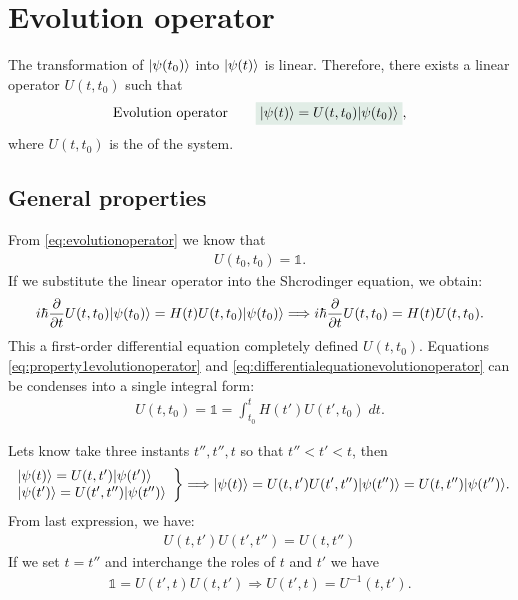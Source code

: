 \section{Evolution operator}

The transformation of $|\psi(t_0)\rangle$ into $|\psi(t)\rangle$ is linear. Therefore, there exists a linear operator $U(t,t_0)$ such that 
\begin{align}
    \text{Evolution operator}\qquad\highlight{\ket{\psi(t)}=U(t,t_0)\ket{\psi{(t_0)}}},
    \label{eq:evolutionoperator}
\end{align}
where $U(t,t_0)$ is the  of the system.
%
\subsection{General properties}
From \eqref{eq:evolutionoperator} we know that 
\begin{align}
    U(t_0,t_0)=\mathds{1}.
    \label{eq:property1evolutionoperator}
\end{align}
If we substitute the linear operator into the Shcrodinger equation, we obtain:
\begin{align}
    i\hbar\frac{\partial}{\partial t}U(t,t_0)|\psi(t_0)\rangle=H(t)U(t,t_0)|\psi(t_0)\rangle\Longrightarrow i\hbar\frac{\partial}{\partial t}U(t,t_0)=H(t)U(t,t_0).
    \label{eq:differentialequationevolutionoperator}
\end{align}
This a first-order differential equation completely defined $U(t,t_0)$. Equations \eqref{eq:property1evolutionoperator} and \eqref{eq:differentialequationevolutionoperator} 
can be condenses into a single integral form:
\begin{align}
    U(t,t_0)=\mathds{1}=\int_{t_0}^tH(t')U(t',t_0)\;dt.
    \label{eq:integralequationevolutionoperator}
\end{align}

Lets know take three instants $t'',t'',t$ so that $t''<t'<t$, then
\begin{align*}
    \left.\begin{array}{l}
        |\psi(t)\rangle=U(t,t')|\psi(t')\rangle\\
        |\psi(t')\rangle=U(t',t'')|\psi(t'')\rangle
    \end{array}\right\}\Longrightarrow |\psi(t)\rangle=U(t,t')U(t',t'')|\psi(t'')\rangle=U(t,t'')|\psi(t'')\rangle.
\end{align*}
From last expression, we have:
\begin{align}
    U(t,t')U(t',t'')=U(t,t'')
\end{align}
If we set $t=t''$ and interchange the roles of $t$ and $t'$ we have
\begin{align}
    \mathds{1}=U(t',t)U(t,t')\Longrightarrow U(t',t)=U^{-1}(t,t').
\end{align}

